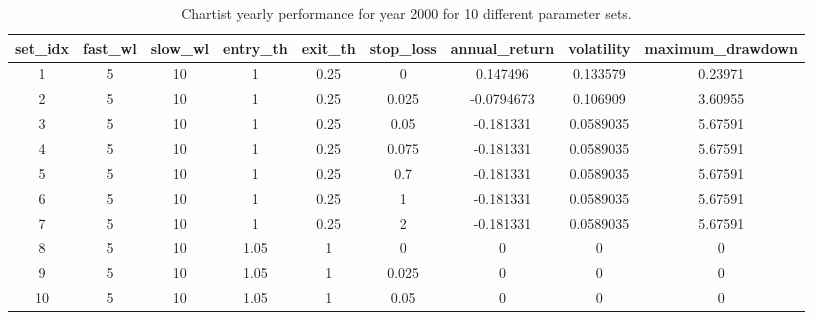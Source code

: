 \begin{table}[h!]
\begin{center}
\begin{tabular}{|c|ccccc|ccc|}
\hline
   set\_idx &   fast\_wl &   slow\_wl &   entry\_th &   exit\_th &   stop\_loss &   annual\_return &   volatility &   maximum\_drawdown \\
\hline
        1 &         5 &        10 &       1    &      0.25 &       0     &       0.147496  &    0.133579  &            0.23971 \\
        2 &         5 &        10 &       1    &      0.25 &       0.025 &      -0.0794673 &    0.106909  &            3.60955 \\
        3 &         5 &        10 &       1    &      0.25 &       0.05  &      -0.181331  &    0.0589035 &            5.67591 \\
        4 &         5 &        10 &       1    &      0.25 &       0.075 &      -0.181331  &    0.0589035 &            5.67591 \\
        5  &         5 &        10 &       1    &      0.25 &       0.7   &      -0.181331  &    0.0589035 &            5.67591 \\
        6  &         5 &        10 &       1    &      0.25 &       1     &      -0.181331  &    0.0589035 &            5.67591 \\
        7  &         5 &        10 &       1    &      0.25 &       2     &      -0.181331  &    0.0589035 &            5.67591 \\
        8 &         5 &        10 &       1.05 &      1    &       0     &       0         &    0         &            0       \\
        9 &         5 &        10 &       1.05 &      1    &       0.025 &       0         &    0         &            0       \\
        10 &         5 &        10 &       1.05 &      1    &       0.05  &       0         &    0         &            0       \\
\hline
\end{tabular}
\end{center}
\caption{Chartist yearly performance for year 2000 for 10 different parameter sets. }
\label{cp_perf}
\end{table}

